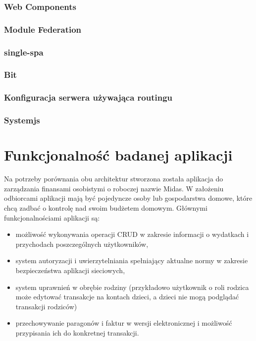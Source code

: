 \documentclass{SGGW-thesis}
\begin{document}
    \subsection{Web Components}
    \subsection{Module Federation}
    \subsection{single-spa}
    \subsection{Bit}
    \subsection{Konfiguracja serwera używająca routingu}
    \subsection{Systemjs}

\chapter{Funkcjonalność badanej aplikacji}
Na potrzeby porównania obu architektur stworzona została aplikacja do zarządzania finansami osobistymi o roboczej nazwie Midas. W założeniu odbiorcami aplikacji mają być pojedyncze osoby lub gospodarstwa domowe, które chcą zadbać o kontrolę nad swoim budżetem domowym. Głównymi funkcjonalnościami aplikacji są:

  \begin{itemize}
    \item możliwość wykonywania operacji CRUD w zakresie informacji o wydatkach i przychodach poszczególnych użytkowników,
    \item system autoryzacji i uwierzytelniania spełniający aktualne normy w zakresie bezpieczeństwa aplikacji sieciowych,
    \item system uprawnień w obrębie rodziny (przykładowo użytkownik o roli rodzica może edytować transakcje na kontach dzieci, a dzieci nie mogą podglądać transakcji rodziców)
    \item przechowywanie paragonów i faktur w wersji elektronicznej i możliwość przypisania ich do konkretnej transakcji.
  \end{itemize}
\end{document}
